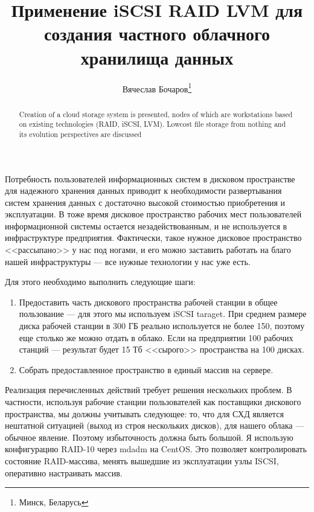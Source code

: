 \documentclass[10pt, a5paper]{article}
\begin{document}
\title{Применение iSCSI RAID LVM для создания частного облачного хранилища данных}%

\author{Вячеслав Бочаров\footnote{Минск, Беларусь}}
\maketitle

\begin{abstract}
Creation of a cloud storage system is presented, nodes of which are workstations based on existing technologies (RAID, iSCSI, LVM). Lowcost file storage from nothing and its evolution perspectives are discussed
\end{abstract}

Потребность пользователей информационных систем в дисковом пространстве для надежного хранения данных приводит к необходимости развертывания систем хранения данных с достаточно высокой стоимостью приобретения и эксплуатации.
В тоже время дисковое пространство рабочих мест пользователей информационной системы остается незадействованным, и не используется в инфраструктуре предприятия.
Фактически, такое нужное дисковое пространство <<рассыпано>> у нас под ногами, и его можно заставить работать на благо нашей инфраструктуры --- все нужные технологии у нас уже есть.

Для этого необходимо выполнить следующие шаги:

\begin{enumerate}
  \item Предоставить часть дискового пространства рабочей станции в общее пользование --- для этого мы используем iSCSI taraget. При среднем размере диска рабочей станции в 300 ГБ реально используется не более 150, поэтому еще столько же можно отдать в облако. Если на предприятии 100 рабочих станций --- результат будет 15 Тб <<сырого>> пространства на 100 дисках.
  \item Собрать предоставленное пространство в единый массив на сервере.
\end{enumerate}

Реализация перечисленных действий требует решения нескольких проблем. 
В частности, используя рабочие станции пользователей как поставщики дискового пространства, мы должны учитывать следующее: то, что для СХД является нештатной ситуацией (выход из строя нескольких дисков),  для нашего облака --- обычное явление. Поэтому избыточность должна быть большой. Я использую конфигурацию RAID-10 через mdadm на CentOS. Это позволяет контролировать состояние RAID-массива, менять вышедшие из эксплуатации узлы ISCSI, оперативно настраивать массив.
\end{document}
